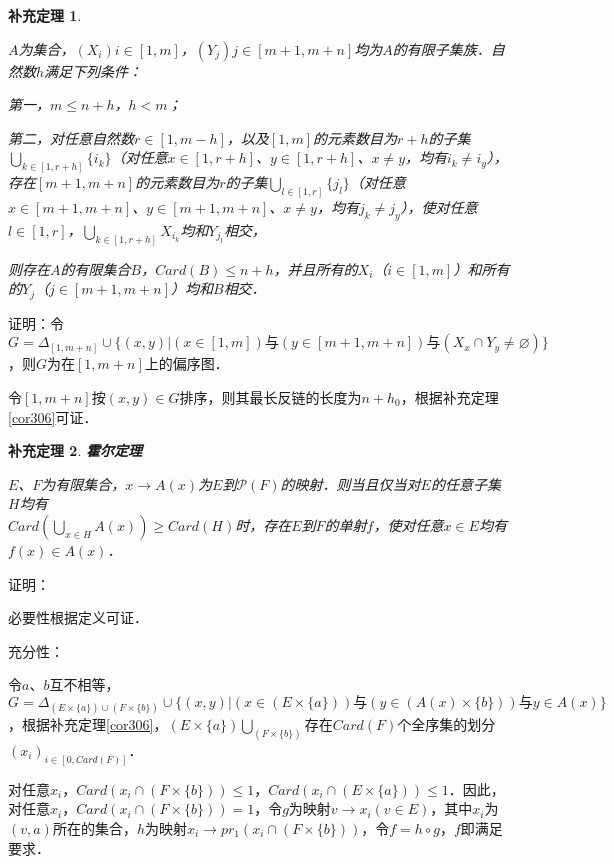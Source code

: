 \documentclass[12pt, a4paper, oneside]{book}
\newtheorem{cor}{补充定理}
\begin{document}
			\begin{cor}\label{cor307}
				\hfill\par
				$A$为集合，$(X_i)i\in [1, m]$，$(Y_j)j\in [m+1, m+n]$均为$A$的有限子集族．自然数$h$满足下列条件：
				\par
				第一，$m\leq n+h$，$h<m$；
				\par
				第二，对任意自然数$r\in [1, m-h]$，以及$[1, m]$的元素数目为$r+h$的子集$\bigcup\limits_{k\in [1, r+h]}\{i_k\}$（对任意$x\in [1, r+h]$、$y \in [1, r+h]$、$x\neq y$，均有$i_k\neq i_y$），存在$[m+1, m+n]$的元素数目为$r$的子集$\bigcup\limits_{l\in [1, r]}\{j_l\}$（对任意$x\in [m+1, m+n]$、$y \in [m+1, m+n]$、$x\neq y$，均有$j_k\neq j_y$），使对任意$l\in [1, r]$，$\bigcup\limits_{k\in [1, r+h]}X_{i_k}$均和$Y_{j_l}$相交，
				\par
				则存在$A$的有限集合$B$，$Card(B)\leq n+h$，并且所有的$X_i$（$i\in [1, m]$）和所有的$Y_j$（$j\in [m+1, m+n]$）均和$B$相交．
			\end{cor}
			证明：令$G=\Delta_{[1, m+n]}\cup\{(x, y)|(x\in [1, m])\text{与}(y\in [m+1, m+n])\text{与}(X_x\cap Y_y\neq \varnothing)\}$，则$G$为在$[1, m+n]$上的偏序图．
			\par
			令$[1, m+n]$按$(x, y)\in G$排序，则其最长反链的长度为$n+h_0$，根据补充定理\ref{cor306}可证．
						
			\begin{cor}\label{cor308}
				\textbf{霍尔定理}
				\par
				$E$、$F$为有限集合，$x\to A(x)$为$E$到$\mathcal{P}(F)$的映射．则当且仅当对$E$的任意子集$H$均有\\$Card(\bigcup\limits_{x\in H}A(x))\geq Card(H)$时，存在$E$到$F$的单射$f$，使对任意$x\in E$均有$f(x)\in A(x)$．	
			\end{cor}
			证明：
			\par
			必要性根据定义可证．
			\par
			充分性：
			\par
			令$a$、$b$互不相等，$G=\Delta_{(E\times \{a\})\cup(F\times \{b\})}\cup\{(x, y)|(x\in (E\times \{a\}))\text{与}(y\in (A(x)\times \{b\}))\text{与}y\in A(x)\}$，根据补充定理\ref{cor306}，$(E\times \{a\})\bigcup\limits_(F\times \{b\})$存在$Card(F)$个全序集的划分\\$(x_i)_{i\in [0, Card(F)]}$．
			\par
			对任意$x_i$，$Card(x_i\cap(F\times \{b\}))\leq 1$，$Card(x_i\cap(E\times \{a\}))\leq 1$．因此，对任意$x_i$，$Card(x_i\cap(F\times \{b\}))=1$，令$g$为映射$v\to x_i(v\in E)$，其中$x_i$为$(v, a)$所在的集合，$h$为映射$x_i\to pr_1(x_i\cap(F\times \{b\}))$，令$f=h\circ g$，$f$即满足要求．
						
\end{document}
